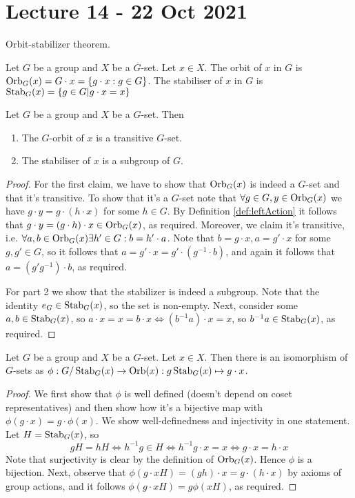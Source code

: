 \section{Lecture 14 - 22 Oct 2021}
Orbit-stabilizer theorem.
\begin{definition}
  Let $G$ be a group and $X$ be a $G$-set. Let $x\in X$. The orbit of $x$ in $G$ is
  $\operatorname*{Orb}_G (x)= G\cdot x = \left\{ g\cdot x :g\in G\right\}$.
  The stabiliser of $x$ in $G$ is $\operatorname*{Stab}_G (x)=\left\{ g\in G | g\cdot x=x \right\}$
  \label{def:orbStab}
\end{definition}


\begin{theorem}
  Let $G$ be a group and $X$ be a $G$-set. Then 
  \begin{enumerate}
    \item The $G$-orbit of $x$ is a transitive $G$-set.
    \item The stabiliser of $x$ is a subgroup of $G$.
  \end{enumerate}
  \label{<+label+>}
\end{theorem}
\begin{proof}
  For the first claim, we have to show that $\operatorname*{Orb}_G(x)$ is indeed a $G$-set and that it's
  transitive. To show that it's a $G$-set note that $\forall g\in G, y\in\operatorname*{Orb}_G(x)$ we
  have $g\cdot y = g\cdot (h\cdot x)$ for some $h\in G$. By Definition
  \ref{def:leftAction} it follows that $g\cdot y = (g\cdot h)\cdot x \in\operatorname*{Orb}_G(x)$, as
  required. Moreover, we claim it's transitive, i.e. $\forall a,b\in\operatorname*{Orb}_G(x)\exists h'\in
  G : b=h'\cdot a$. Note that $b=g\cdot x, a=g'\cdot x$ for some $g,g'\in G$, so it
  follows that $a=g'\cdot x = g'\cdot (g^{-1}\cdot b)$, and again it follows that
  $a=(g'g^{-1})\cdot b$, as required.

  For part 2 we show that the stabilizer is indeed a subgroup. Note that the identity
  $e_G\in\operatorname*{Stab}_G(x)$, so the set is non-empty. Next, consider some $a,b\in\operatorname*{Stab}_G(x)$, so
  $a\cdot x=x=b\cdot x \iff (b^{-1}a)\cdot x =x$, so $b^{-1}a\in\operatorname*{Stab}_G(x)$, as required.
\end{proof}


\begin{theorem}
  Let $G$ be a group and $X$ be a $G$-set. Let $x\in X$. Then there is an isomorphism of
  $G$-sets as $\phi:G/\operatorname*{Stab}_{G}(x)\to \operatorname*{Orb}(x):g\operatorname*{Stab}_G(x)\mapsto g\cdot x$.
  \label{thm:orbStab}
\end{theorem}
\begin{proof}
  We first show that $\phi$ is well defined (doesn't depend on coset representatives) and
  then show how it's a bijective map with $\phi(g\cdot x)=g\cdot \phi(x)$. We show
  well-definedness and injectivity in one statement. Let $H=\operatorname*{Stab}_G(x)$, so
  \[gH=hH \iff h^{-1}g\in H \iff h^{-1}g \cdot x = x \iff g\cdot x = h\cdot x\]
  Note that surjectivity is clear by the definition of $\operatorname*{Orb}_G(x)$. Hence $\phi$ is a
  bijection. Next, observe that $\phi(g\cdot xH)=(gh)\cdot x = g\cdot (h\cdot x)$ by
  axioms of group actions, and it follows $\phi(g\cdot xH)=g\phi(xH)$, as required.
\end{proof}


